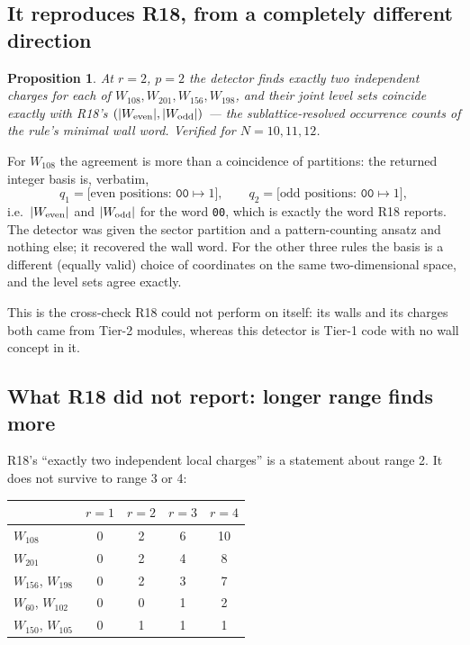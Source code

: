 \documentclass[11pt]{article}
\newcommand{\rt}[1]{\texttt{#1}}
\theoremstyle{plain}
\newtheorem{proposition}{Proposition}
\begin{document}
\subsection{It reproduces R18, from a completely different direction}

\begin{proposition}
At $r=2$, $p=2$ the detector finds exactly two independent charges for each of
$W_{108}, W_{201}, W_{156}, W_{198}$, and their joint level sets coincide
exactly with R18's $(|W_{\rm even}|, |W_{\rm odd}|)$ --- the sublattice-resolved
occurrence counts of the rule's minimal wall word. Verified for $N=10,11,12$.
\end{proposition}

\noindent For $W_{108}$ the agreement is more than a coincidence of partitions:
the returned integer basis is, verbatim,
\[
q_1 = \bigl[\text{even positions: } \rt{00}\mapsto 1\bigr], \qquad
q_2 = \bigl[\text{odd positions: } \rt{00}\mapsto 1\bigr],
\]
i.e.\ $|W_{\rm even}|$ and $|W_{\rm odd}|$ for the word \rt{00}, which is
exactly the word R18 reports. The detector was given the sector partition and
a pattern-counting ansatz and nothing else; it recovered the wall word. For the
other three rules the basis is a different (equally valid) choice of coordinates
on the same two-dimensional space, and the level sets agree exactly.

This is the cross-check R18 could not perform on itself: its walls and its
charges both came from Tier-2 modules, whereas this detector is Tier-1 code
with no wall concept in it.

\subsection{What R18 did not report: longer range finds more}

R18's ``exactly two independent local charges'' is a statement about range 2.
It does not survive to range 3 or 4:

\begin{center}
\small
\begin{tabular}{lcccc}
\toprule
& $r=1$ & $r=2$ & $r=3$ & $r=4$ \\
\midrule
$W_{108}$ & 0 & 2 & 6 & 10 \\
$W_{201}$ & 0 & 2 & 4 & 8 \\
$W_{156}$, $W_{198}$ & 0 & 2 & 3 & 7 \\
\midrule
$W_{60}$, $W_{102}$ & 0 & 0 & 1 & 2 \\
$W_{150}$, $W_{105}$ & 0 & 1 & 1 & 1 \\
\bottomrule
\end{tabular}
\end{center}
\end{document}
